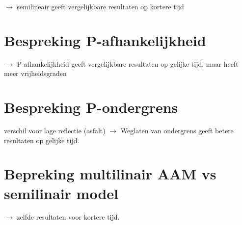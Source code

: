\documentclass[12pt]{report}
\begin{document}
$\rightarrow$ semilineair geeft vergelijkbare resultaten op kortere tijd

\section{Bespreking P-afhankelijkheid}

$\rightarrow$ P-afhankelijkheid geeft vergelijkbare resultaten op gelijke tijd, maar heeft meer vrijheidsgraden

\section{Bespreking P-ondergrens}

verschil voor lage reflectie (asfalt)
$\rightarrow$ Weglaten van ondergrens geeft betere resultaten op gelijke tijd.

\section{Bepreking multilinair AAM vs semilinair model}

$\rightarrow$ zelfde resultaten voor kortere tijd.

\begin{appendices}


\end{appendices}


\begin{flushleft}
\nocite{*}
{}


\end{flushleft}
\end{document}
